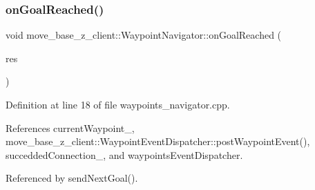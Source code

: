 \subsubsection{\texorpdfstring{on\+Goal\+Reached()}{onGoalReached()}}
{\footnotesize\ttfamily void move\+\_\+base\+\_\+z\+\_\+client\+::\+Waypoint\+Navigator\+::on\+Goal\+Reached (\begin{DoxyParamCaption}\item[{\hyperlink{classmove__base__z__client_1_1ClMoveBaseZ_a3b774d99d3dd4526f99b968d65ef5834}{Cl\+Move\+Base\+Z\+::\+Result\+Const\+Ptr} \&}]{res }\end{DoxyParamCaption})\hspace{0.3cm}{\ttfamily [private]}}



Definition at line 18 of file waypoints\+\_\+navigator.\+cpp.



References current\+Waypoint\+\_\+, move\+\_\+base\+\_\+z\+\_\+client\+::\+Waypoint\+Event\+Dispatcher\+::post\+Waypoint\+Event(), succedded\+Connection\+\_\+, and waypoints\+Event\+Dispatcher.



Referenced by send\+Next\+Goal().



